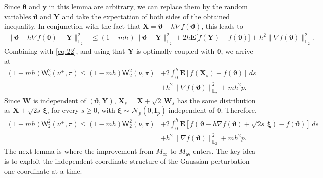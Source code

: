 \documentclass[aos,reqno]{imsart}
\newcommand\bY{\boldsymbol Y}
\newcommand\bX{\boldsymbol X}
\newcommand\bW{\boldsymbol W}
\newcommand\by{\boldsymbol y}
\newcommand\bxi{\boldsymbol\xi}
\newcommand\bfI{\mathbf I}
\newcommand\btheta{\boldsymbol\theta}
\newcommand\bvartheta{\boldsymbol\vartheta}
\def\wass{\mathsf{W}}
\def\Mav{M_{\textsf{av}}}
\def\Mmax{M_{\infty}}
\theoremstyle{definition}
\begin{document}
Since $\btheta$ and $\by$ in this lemma are arbitrary,
we can replace them by the random variables 
$\bvartheta$ and $\bY$ and take the expectation of 
both sides of the obtained inequality. In conjunction 
with the fact that $\bX = \bvartheta - h\nabla f 
(\bvartheta)$,  this leads to 
\begin{align}
    \|\bvartheta - h\nabla f(\bvartheta) - \bY 
    \|^2_{\mathbb L_2}
    &\leqslant (1-mh) \|\bvartheta - \bY\|_{\mathbb 
    L_2}^2 + 2h\mathbf E\big[f(\bY) - f(\bvartheta)
    \big]  + h^2\|\nabla f(\bvartheta)\|_{\mathbb
    L_2}^2.
\end{align}
Combining with \eqref{eq:22}, and using  that $\bY$ is 
optimally coupled with $\bvartheta$,  we arrive at
\begin{align}
    (1+mh)\wass_2^2(\nu^+, \pi) 
    \leqslant (1-mh)\wass_2^2(\nu,\pi) &+ 2\int_0^h
    \mathbf E[f(\bX_s) -f(\bvartheta)]\,ds\\
    & + h^2\|\nabla f(\bvartheta)\|_{\mathbb 
    L_2}^2 + mh^2p. 
\end{align}
Since $\bW$ is independent of $(\bvartheta,\bY)$, 
$\bX_s =\bX + \sqrt{2}\,\bW_s$ has the same distribution 
as $\bX + \sqrt{2s}\,\bxi$, for every $s\geqslant 0$, with
$\bxi\sim \mathcal N_p(0,\bfI_p)$ independent of
$\bvartheta$. Therefore, 
\begin{align}
    (1+mh)\wass_2^2(\nu^+, \pi) 
    \leqslant (1-mh)\wass_2^2(\nu,\pi) &+ 2\int_0^h
    \mathbf E[f(\bvartheta -h\nabla f(\bvartheta) + 
    \sqrt{2s}\,\bxi) -f(\bvartheta)]\,ds\\
    & + h^2\|\nabla f(\bvartheta)\|_{\mathbb 
    L_2}^2 + mh^2p. \label{eq:20}
\end{align}
The next lemma is where the improvement from $\Mmax$ 
to $\Mav$ enters. The key idea is to exploit the 
independent coordinate structure of the Gaussian 
perturbation one coordinate at a time.
\end{document}

